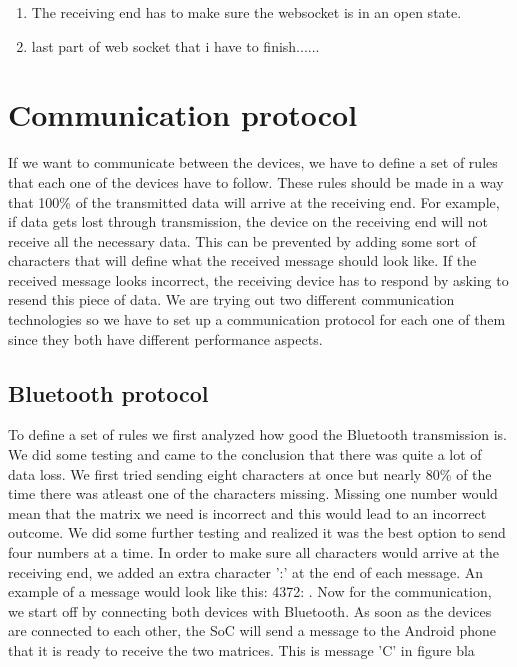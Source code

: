 \documentclass[a4paper, 11pt]{report}
\begin{document}
	\begin{enumerate}
		\item The receiving end has to make sure the websocket is in an open state. 
		\item last part of web socket that i have to finish......
	\end{enumerate}
		

	
	
	
\section{Communication protocol}
If we want to communicate between the devices, we have to define a set of rules that each one of the devices have to follow. These rules should be made in a way that 100\% of the transmitted data will arrive at the receiving end. For example, if data gets lost through transmission, the device on the receiving end will not receive all the necessary data. This can be prevented by adding some sort of characters that will define what the received message should look like. If the received message looks incorrect, the receiving device has to respond by asking to resend this piece of data. We are trying out two different communication technologies so we have to set up a communication protocol for each one of them since they both have different performance aspects.

	\subsection{Bluetooth protocol}
To define a set of rules we first analyzed how good the Bluetooth transmission is. We did some testing and came to the conclusion that there was quite a lot of data loss. We first tried sending eight characters at once but nearly 80\% of the time there was atleast one of the characters missing. Missing one number would mean that the matrix we need is incorrect and this would lead to an incorrect outcome. We did some further testing and realized it was the best option to send four numbers at a time.
In order to make sure all characters would arrive at the receiving end, we added an extra character ':' at the end of each message. An example of a message would look like this: 4372: .
Now for the communication, we start off by connecting both devices with Bluetooth. As soon as the devices are connected to each other, the SoC will send a message to the Android phone that it is ready to receive the two matrices. This is message 'C' in figure bla




	



\end{document}
